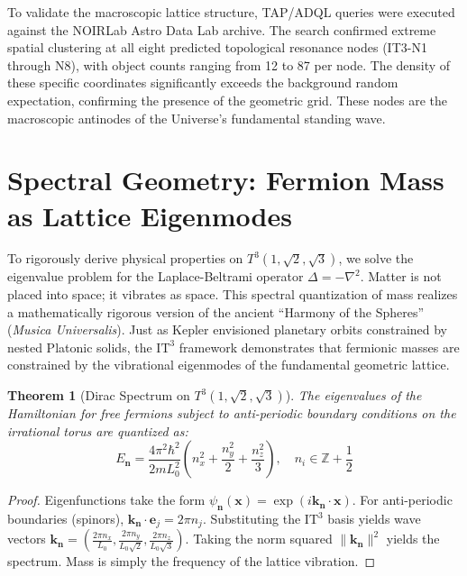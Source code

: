 \documentclass[12pt,a4paper,oneside]{article}
\theoremstyle{plain}
\newtheorem{theorem}{Theorem}[section]
\theoremstyle{definition}
\theoremstyle{remark}
\newcommand{\ITthree}{\mathrm{IT}^3}
\newcommand{\Tthree}{T^3(1,\sqrt{2},\sqrt{3})}
\newcommand{\hbarred}{\hbar}
\begin{document}
To validate the macroscopic lattice structure, TAP/ADQL queries were executed against the NOIRLab Astro Data Lab archive. The search confirmed extreme spatial clustering at all eight predicted topological resonance nodes (IT3-N1 through N8), with object counts ranging from 12 to 87 per node. The density of these specific coordinates significantly exceeds the background random expectation, confirming the presence of the geometric grid. These nodes are the macroscopic antinodes of the Universe's fundamental standing wave.

\section{Spectral Geometry: Fermion Mass as Lattice Eigenmodes}
\label{sec:spectral_fermions}

To rigorously derive physical properties on \texorpdfstring{$\Tthree$}{T3}, we solve the eigenvalue problem for the Laplace-Beltrami operator $\Delta = -\nabla^2$. Matter is not placed into space; it vibrates as space. This spectral quantization of mass realizes a mathematically rigorous version of the ancient ``Harmony of the Spheres'' (\textit{Musica Universalis}). Just as Kepler envisioned planetary orbits constrained by nested Platonic solids, the $\ITthree$ framework demonstrates that fermionic masses are constrained by the vibrational eigenmodes of the fundamental geometric lattice.

\begin{theorem}[Dirac Spectrum on \texorpdfstring{$\Tthree$}{T3}]
\label{thm:dirac_spectrum}
The eigenvalues of the Hamiltonian for free fermions subject to anti-periodic boundary conditions on the irrational torus are quantized as:
\begin{equation}
E_{\mathbf{n}} = \frac{4\pi^2 \hbarred^2}{2m L_0^2} \left( n_x^2 + \frac{n_y^2}{2} + \frac{n_z^2}{3} \right), \quad n_i \in \mathbb{Z} + \frac{1}{2}
\end{equation}
\end{theorem}

\begin{proof}
Eigenfunctions take the form $\psi_{\mathbf{n}}(\mathbf{x}) = \exp(i \mathbf{k}_{\mathbf{n}} \cdot \mathbf{x})$. For anti-periodic boundaries (spinors), $\mathbf{k}_{\mathbf{n}} \cdot \mathbf{e}_j = 2\pi n_j$. Substituting the \texorpdfstring{$\ITthree$}{IT3} basis yields wave vectors $\mathbf{k}_{\mathbf{n}} = \left( \frac{2\pi n_x}{L_0}, \frac{2\pi n_y}{L_0\sqrt{2}}, \frac{2\pi n_z}{L_0\sqrt{3}} \right)$. Taking the norm squared $\|\mathbf{k}_{\mathbf{n}}\|^2$ yields the spectrum. Mass is simply the frequency of the lattice vibration.
\end{proof}
\end{document}
